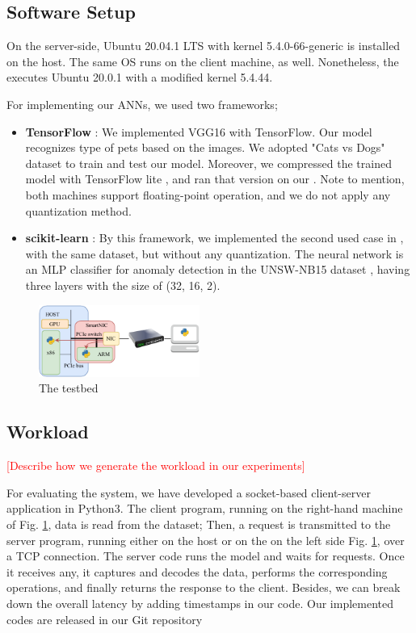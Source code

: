\subsection{Software Setup}
On the server-side, Ubuntu 20.04.1 LTS with kernel 5.4.0-66-generic is installed on the host. The same OS runs on the client machine, as well. Nonetheless, the \smartnic executes Ubuntu 20.0.1 with a modified kernel 5.4.44. 
\par
For implementing our ANNs, we used two frameworks; 
\begin{itemize}
 \item \textbf{TensorFlow}  \cite{abadi2016tensorflow}: We implemented VGG16 \cite{simonyan2014very} with TensorFlow. Our model recognizes type of pets based on the images. We adopted "Cats vs Dogs" dataset \cite{petimages} to train and test our model. Moreover, we compressed the trained model with TensorFlow lite \cite{petimages}, and ran that version on our \smartnic. Note to mention, both machines support floating-point operation, and we do not apply any quantization method.
 \item \textbf{scikit-learn}  \cite{scikit-learn}: By this framework, we implemented the second used case in \cite{siracusano2020running}, with the same dataset, but without any quantization. The neural network is an MLP classifier for anomaly detection in the UNSW-NB15 dataset \cite{UNSW}, having three layers with the size of (32, 16, 2).
\end{itemize}

\begin{figure}[ht!]
\centering
    \includegraphics[width=0.47\textwidth]{./figs/testbed.pdf}
    \caption{The testbed}
    \label{testbed}
\end{figure}

\subsection{Workload}
\textcolor{red}{[Describe how we generate the workload in our experiments]}

For evaluating the system, we have developed a socket-based client-server application in Python3. The client program, running on the right-hand machine of Fig. \ref{testbed}, data is read from the dataset; Then, a request is transmitted to the server program, running either on the host or on the \smartnic on the left side Fig. \ref{testbed}, over a TCP connection. The server code runs the model and waits for requests. Once it receives any, it captures and decodes the data, performs the corresponding operations, and finally returns the response to the client. Besides, we can break down the overall latency by adding timestamps in our code. Our implemented codes are released in our Git repository \cite{sdn2021git}

